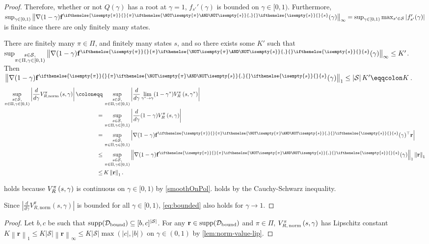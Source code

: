 \documentclass{article}
\renewcommand{\abs}[1]{\left|#1\right|}
\newcommand*{\prn}[1]{\left(#1\right)}
\newcommand*{\defeq}{\coloneqq} %
\newcommand*{\eqdef}{\eqqcolon} %
\newcommand*{\St}{\mathcal{S}}
\newcommand*{\rf}{\mathbf{r}} %
\newcommand*{\D}{\mathcal{D}} %
\newcommand*{\Dbd}{\D_{\text{bound}}}
\newcommand*{\f}{\mathbf{f}} %
\newcommand*{\fpi}[2][\pi]{\f^{
\ifthenelse{\isempty{#1}}{}{#1} %
\ifthenelse{\NOT\isempty{#1} \AND \NOT\isempty{#2}}{,}{} %
\ifthenelse{\isempty{#2}}{}{#2}}} %
\newcommand*{\lone}[1]{\left \lVert#1\right \rVert_1}
\newcommand*{\linfty}[1]{\left \lVert#1\right \rVert_\infty}
\theoremstyle{definition}
\begin{document}
\begin{appendices}
\begin{proof}
Therefore, whether or not $Q(\gamma)$ has a root at $\gamma=1$, $f_{s'}'(\gamma)$ is bounded on $\gamma\in[0,1)$. Furthermore, $\sup_{\gamma\in[0,1)}\linfty{\nabla(1-\gamma)\fpi{s}(\gamma)}=\sup_{\gamma\in[0,1)}\max_{s'\in\St} \abs{f_{s'}'(\gamma)}$ is finite since there are only finitely many states.

There are finitely many $\pi\in\Pi$, and finitely many states $s$, and so there exists some $K'$ such that $\sup_{\substack{s\in\St,\\ \pi\in\Pi,\gamma\in [0,1)}} \linfty{\nabla(1-\gamma)\fpi{s}(\gamma)}\leq K'$. Then $\lone{\nabla(1-\gamma)\fpi{s}(\gamma)}\leq \abs{\St}K'\eqdef K$. 
\begin{align}
    \sup_{\substack{s\in\St,\\ \pi\in\Pi,\gamma\in [0,1)}} \abs{\frac{d}{d\gamma}V^\pi_{R,\text{norm}}\prn{s,\gamma}}\defeq\,&\sup_{\substack{s\in\St,\\ \pi\in\Pi,\gamma\in [0,1)}} \abs{\frac{d}{d\gamma}\lim_{\gamma^*\to\gamma}(1-\gamma^*)V^\pi_{R}\prn{s,\gamma^*}}\\
    =\,&\sup_{\substack{s\in\St,\\ \pi\in\Pi,\gamma\in [0,1)}} \abs{\frac{d}{d\gamma}(1-\gamma)V^\pi_{R}\prn{s,\gamma}}\label{eq:lim-disappear}\\
    =\,&\sup_{\substack{s\in\St,\\ \pi\in\Pi,\gamma\in [0,1)}} \abs{\nabla (1-\gamma)\fpi{s}(\gamma)^\top\rf}\label{eq:on-pol-rat}\\
    \leq\, & \sup_{\substack{s\in\St,\\ \pi\in\Pi,\gamma\in [0,1)}} \lone{\nabla (1-\gamma)\fpi{s}(\gamma)}\lone{\rf}\label{eq:cs}\\
    \leq\, & K\lone{\rf}.\label{eq:bounded}
\end{align}

 holds because $\Vf[\pi]{s,\gamma}$ is continuous on $\gamma\in[0,1)$ by \cref{smoothOnPol}.  holds by the Cauchy-Schwarz inequality.

Since $\abs{\frac{d}{d\gamma}V^\pi_{R,\text{norm}}\prn{s,\gamma}}$ is bounded for all $\gamma \in [0,1)$, \cref{eq:bounded} also holds for $\gamma\to 1$. 
\end{proof}

\ContPower*
\begin{proof}
Let $b,c$ be such that $\supp[\Dbd]\subseteq [b,c]^{\abs{\St}}$. For any $\rf\in\supp[\Dbd]$ and $\pi\in\Pi$, $\VfNorm[\pi]{s,\gamma}$ has Lipschitz constant $K\lone{\rf}\leq K \abs{\St}\linfty{\rf}\leq K\abs{\St}\max(\abs{c},\abs{b})$ on $\gamma\in(0,1)$ by \cref{lem:norm-value-lip}.


\end{proof}
\end{appendices}
\end{document}
